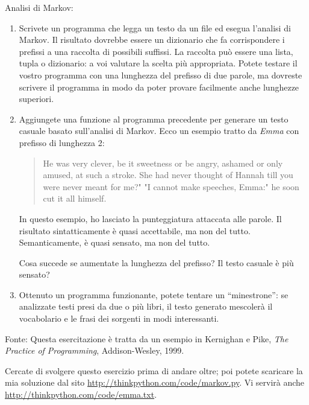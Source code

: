 \documentclass[10pt]{book}
\begin{document}
\vspace{0.2in}
\begin{exercise}

Analisi di Markov:

\begin{enumerate}

\item Scrivete un programma che legga un testo da un file ed esegua l'analisi di Markov. Il risultato dovrebbe essere un dizionario che fa corrispondere i prefissi a una raccolta di possibili suffissi. La raccolta può essere una lista, tupla o dizionario: a voi valutare la scelta più appropriata. Potete testare il vostro programma con una lunghezza del prefisso di due parole, ma dovreste scrivere il programma in modo da poter provare facilmente anche lunghezze superiori.

\item Aggiungete una funzione al programma precedente per generare un testo casuale basato sull'analisi di Markov. Ecco un esempio tratto da {\em Emma} con prefisso di lunghezza 2: 

\begin{quote}
He was very clever, be it sweetness or be angry, ashamed or only
amused, at such a stroke. She had never thought of Hannah till you
were never meant for me?" "I cannot make speeches, Emma:" he soon cut
it all himself.
\end{quote}

In questo esempio, ho lasciato la punteggiatura attaccata alle parole. Il risultato sintatticamente è quasi accettabile, ma non del tutto. Semanticamente, è quasi sensato, ma non del tutto.

Cosa succede se aumentate la lunghezza del prefisso? Il testo casuale è più sensato?

\item Ottenuto un programma funzionante, potete tentare un ``minestrone'': se analizzate testi presi da due o più libri, il testo generato mescolerà il vocabolario e le frasi dei sorgenti in modi interessanti.

\end{enumerate}

Fonte: Questa esercitazione è tratta da un esempio in Kernighan e
Pike, {\em The Practice of Programming}, Addison-Wesley, 1999.

\end{exercise}

Cercate di svolgere questo esercizio prima di andare oltre; poi potete scaricare la mia soluzione dal sito \url{http://thinkpython.com/code/markov.py}.  Vi servirà anche \url{http://thinkpython.com/code/emma.txt}.
\end{document}
